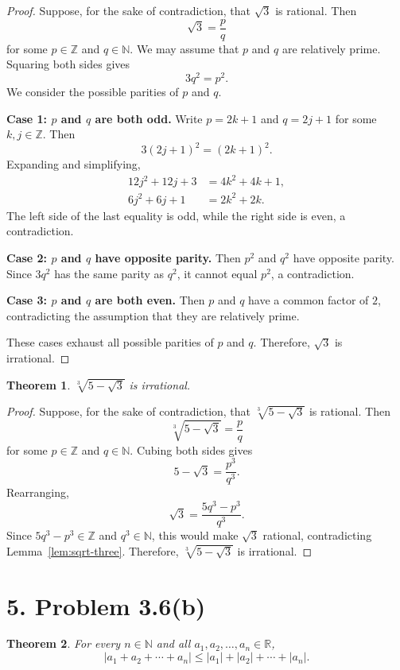 \documentclass[11pt]{article}
\newtheorem{theorem}{Theorem}
\begin{document}
\begin{proof}
Suppose, for the sake of contradiction, that \(\sqrt{3}\) is rational.
Then
\[
\sqrt{3}=\frac{p}{q}
\]
for some \(p\in\mathbb{Z}\) and \(q\in\mathbb{N}\).
We may assume that \(p\) and \(q\) are relatively prime.
Squaring both sides gives
\[
3q^2=p^2.
\]
We consider the possible parities of \(p\) and \(q\).

\textbf{Case 1: \(p\) and \(q\) are both odd.}
Write \(p=2k+1\) and \(q=2j+1\) for some \(k,j\in\mathbb{Z}\).
Then
\[
3(2j+1)^2=(2k+1)^2.
\]
Expanding and simplifying,
\begin{align*}
12j^2+12j+3&=4k^2+4k+1,\\
6j^2+6j+1&=2k^2+2k.
\end{align*}
The left side of the last equality is odd, while the right side is even, a contradiction.

\textbf{Case 2: \(p\) and \(q\) have opposite parity.}
Then \(p^2\) and \(q^2\) have opposite parity.
Since \(3q^2\) has the same parity as \(q^2\), it cannot equal \(p^2\), a contradiction.

\textbf{Case 3: \(p\) and \(q\) are both even.}
Then \(p\) and \(q\) have a common factor of \(2\), contradicting the assumption that they are relatively prime.

These cases exhaust all possible parities of \(p\) and \(q\).
Therefore, \(\sqrt{3}\) is irrational.
\end{proof}

\begin{theorem}
\(\sqrt[3]{5-\sqrt{3}}\) is irrational.
\end{theorem}

\begin{proof}
Suppose, for the sake of contradiction, that \(\sqrt[3]{5-\sqrt{3}}\) is rational.
Then
\[
\sqrt[3]{5-\sqrt{3}}=\frac{p}{q}
\]
for some \(p\in\mathbb{Z}\) and \(q\in\mathbb{N}\).
Cubing both sides gives
\[
5-\sqrt{3}=\frac{p^3}{q^3}.
\]
Rearranging,
\[
\sqrt{3}=\frac{5q^3-p^3}{q^3}.
\]
Since \(5q^3-p^3\in\mathbb{Z}\) and \(q^3\in\mathbb{N}\), this would make \(\sqrt{3}\) rational, contradicting Lemma~\ref{lem:sqrt-three}.
Therefore, \(\sqrt[3]{5-\sqrt{3}}\) is irrational.
\end{proof}

\section*{5. Problem 3.6(b)}

\begin{theorem}
For every \(n\in\mathbb{N}\) and all \(a_1,a_2,\ldots,a_n\in\mathbb{R}\),
\[
\left|a_1+a_2+\cdots+a_n\right|
\leq |a_1|+|a_2|+\cdots+|a_n|.
\]
\end{theorem}
\end{document}
